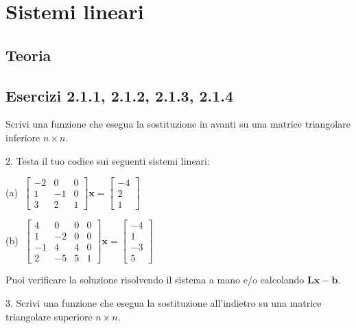 \documentclass[letterpaper, 12pt]{article}
\begin{document}
\section{Sistemi lineari}
\label{sistemi_lineari}
\subsection{Teoria}

\subsection{Esercizi 2.1.1, 2.1.2, 2.1.3, 2.1.4}
Scrivi una funzione che esegua la sostituzione in avanti su una matrice triangolare inferiore $n\times n$.

2. Testa il tuo codice sui seguenti sistemi lineari:
     
    \begin{minipage}{0.48\textwidth}
        (a) $\; \begin{bmatrix}
            -2 & 0 & 0 \\
            1 & -1 & 0 \\
            3 & 2 & 1 
          \end{bmatrix} 
          \mathbf{x} = \begin{bmatrix}
            -4 \\ 2 \\ 1
          \end{bmatrix}$
    \end{minipage}
    \hfill
    \begin{minipage}{0.48\textwidth}
        (b) $\;\begin{bmatrix}
            4 & 0 & 0 & 0 \\
            1 & -2 & 0 & 0 \\
            -1 & 4 & 4 & 0 \\
            2 & -5 & 5 & 1
          \end{bmatrix} 
          \mathbf{x} = \begin{bmatrix}
            -4 \\ 1 \\ -3 \\ 5
          \end{bmatrix}$
    \end{minipage}

Puoi verificare la soluzione risolvendo il sistema a mano e/o calcolando $\mathbf{L}\mathbf{x} - \mathbf{b}$.

3. Scrivi una funzione che esegua la sostituzione all'indietro su una matrice triangolare superiore $n\times n$.
\end{document}
